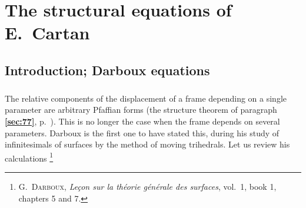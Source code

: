 \documentclass[leqno,11pt]{book}
\numberwithin{equation}{chapter}
\theoremstyle{shape1}
\theoremstyle{shapesmall}
\newcommand{\fsref}[1]{{\rm\textsection\textbf{\ref{sec:#1}}}}
\begin{document}
\chapter{The structural equations of E.~Cartan}
\label{cha:struct-equat-e}



\section{Introduction; Darboux equations}
\label{sec:intr-darb-equat}

\paragraph{}
\label{sec:152}
The relative components of the displacement of a frame depending on a single parameter are arbitrary Pfaffian forms (the structure theorem of paragraph \fsref{77}, p.~\pageref{sec:77}). This is no longer the case when the frame depends on several parameters. Darboux is the first one to have stated this, during his study of infinitesimals of surfaces by the method of moving trihedrals. Let us review his calculations \footnote{\textsc{G.~Darboux}, \emph{Leçon sur la théorie générale des surfaces}, vol.~1, book 1, chapters 5 and 7.}
\end{document}
